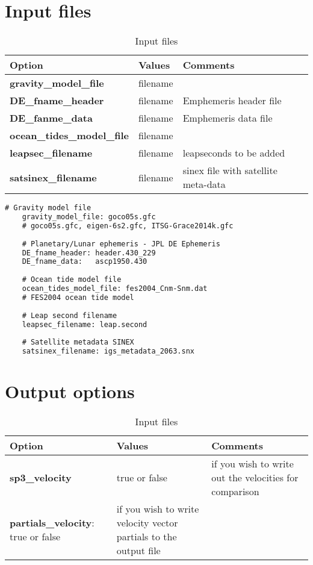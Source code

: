 \section{Input files}
\begin{table}[h!]
	\begin{tabular}{|p{4.5cm}|p{2cm}|p{3.5cm}|}
		\hline
		Option & Values & Comments \\
		\hline
        \textbf{gravity\_model\_file} & filename & \\
        \textbf{DE\_fname\_header} & filename &  Emphemeris header file \\
        \textbf{DE\_fanme\_data} & filename & Emphemeris data file \\
        \textbf{ocean\_tides\_model\_file} & filename & \\
        \textbf{leapsec\_filename} & filename & leapseconds to be added\\
        \textbf{satsinex\_filename} & filename & sinex file with satellite meta-data\\       
		\hline
	\end{tabular}
	\caption{Input files}
	\label{table:label_name}
\end{table}
%
{\small
	\begin{lstlisting}[language=xml,caption=yaml example for general input files]
	# Gravity model file
	gravity_model_file: goco05s.gfc  
	# goco05s.gfc, eigen-6s2.gfc, ITSG-Grace2014k.gfc
	
	# Planetary/Lunar ephemeris - JPL DE Ephemeris
	DE_fname_header: header.430_229
	DE_fname_data:   ascp1950.430
	
	# Ocean tide model file
	ocean_tides_model_file: fes2004_Cnm-Snm.dat 
	# FES2004 ocean tide model
	
	# Leap second filename
	leapsec_filename: leap.second
	
	# Satellite metadata SINEX
	satsinex_filename: igs_metadata_2063.snx	
	\end{lstlisting}
}
%

\section{Output options}
\begin{table}[h!]
	\begin{tabular}{|p{4.5cm}|p{2cm}|p{3.5cm}|}
		\hline
		Option & Values & Comments \\
		\hline
        \textbf{sp3\_velocity} & true or false & if you wish to write out the velocities for comparison \\
        \textbf{partials\_velocity}: true or false & if you wish to write velocity vector partials to the output file\\
		\hline
	\end{tabular}
	\caption{Input files}
	\label{table:label_name}
\end{table}


